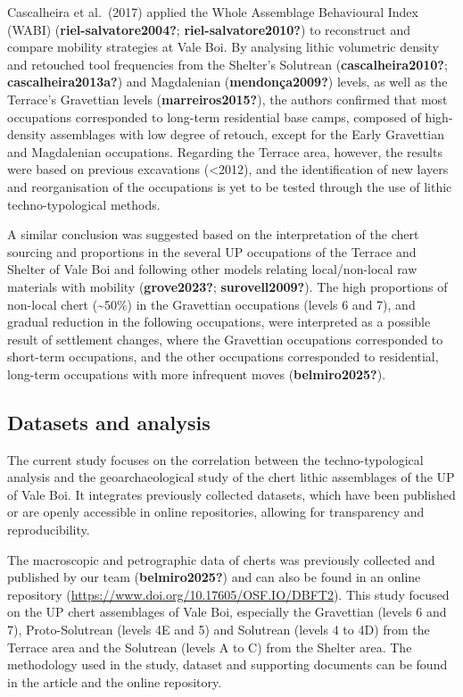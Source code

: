 \documentclass[
  a4paper,
  DIV=11,
  numbers=noendperiod]{scrreprt}
\begin{document}
Cascalheira et al.~(2017) applied the Whole Assemblage Behavioural Index
(WABI) (\textbf{riel-salvatore2004?}; \textbf{riel-salvatore2010?}) to
reconstruct and compare mobility strategies at Vale Boi. By analysing
lithic volumetric density and retouched tool frequencies from the
Shelter's Solutrean (\textbf{cascalheira2010?};
\textbf{cascalheira2013a?}) and Magdalenian (\textbf{mendonça2009?})
levels, as well as the Terrace's Gravettian levels
(\textbf{marreiros2015?}), the authors confirmed that most occupations
corresponded to long-term residential base camps, composed of
high-density assemblages with low degree of retouch, except for the
Early Gravettian and Magdalenian occupations. Regarding the Terrace
area, however, the results were based on previous excavations
(\textless2012), and the identification of new layers and reorganisation
of the occupations is yet to be tested through the use of lithic
techno-typological methods.

A similar conclusion was suggested based on the interpretation of the
chert sourcing and proportions in the several UP occupations of the
Terrace and Shelter of Vale Boi and following other models relating
local/non-local raw materials with mobility (\textbf{grove2023?};
\textbf{surovell2009?}). The high proportions of non-local chert
(\textasciitilde50\%) in the Gravettian occupations (levels 6 and 7),
and gradual reduction in the following occupations, were interpreted as
a possible result of settlement changes, where the Gravettian
occupations corresponded to short-term occupations, and the other
occupations corresponded to residential, long-term occupations with more
infrequent moves (\textbf{belmiro2025?}).

\subsection{Datasets and analysis}\label{datasets-and-analysis}

The current study focuses on the correlation between the
techno-typological analysis and the geoarchaeological study of the chert
lithic assemblages of the UP of Vale Boi. It integrates previously
collected datasets, which have been published or are openly accessible
in online repositories, allowing for transparency and reproducibility.

The macroscopic and petrographic data of cherts was previously collected
and published by our team (\textbf{belmiro2025?}) and can also be found
in an online repository
(\url{https://www.doi.org/10.17605/OSF.IO/DBFT2}). This study focused on
the UP chert assemblages of Vale Boi, especially the Gravettian (levels
6 and 7), Proto-Solutrean (levels 4E and 5) and Solutrean (levels 4 to
4D) from the Terrace area and the Solutrean (levels A to C) from the
Shelter area. The methodology used in the study, dataset and supporting
documents can be found in the article and the online repository.
\end{document}
